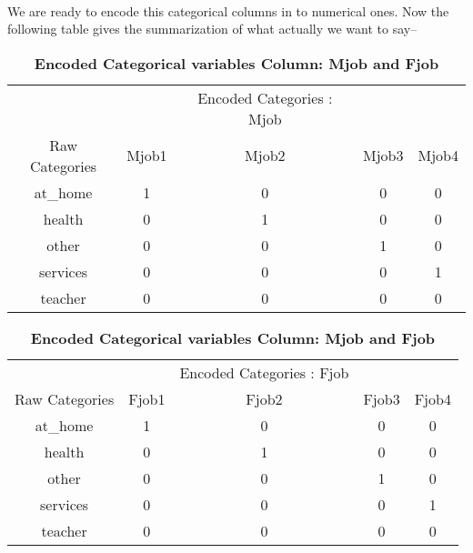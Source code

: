 \documentclass[A4paper,11pt]{report}
\begin{document}
			\paragraph{}We are ready to encode this categorical columns in to numerical ones. Now the following table gives the summarization of what actually we want to say--
			\begin{table}[htb]
				\footnotesize
				\caption{\textbf{Encoded Categorical variables Column: Mjob and Fjob}}\label{tab:table}
				\begin{adjustbox}{width=\textwidth,center = \textwidth}
				\begin{tabular}{|c|c c c c |}
					\hline
					& &  Encoded Categories : Mjob& &\\
					\cline{2-5}
					Raw Categories & Mjob1&	Mjob2&	Mjob3&	Mjob4\\	
					\hline
					at\_home &1 &0 &0 &0 \\
					health &0 &1 &0 &0 \\
					other &0 &0 &1 &0\\
					services &0 &0 &0 &1\\
					teacher &0 &0 &0 &0\\
					\hline
				\end{tabular}
			\begin{tabular}{|c|c c c c |}
				\hline
				& &  Encoded Categories : Fjob& &\\
				\cline{2-5}
				Raw Categories & Fjob1&	Fjob2&	Fjob3&	Fjob4\\	
				\hline
				at\_home &1 &0 &0 &0 \\
				health &0 &1 &0 &0 \\
				other &0 &0 &1 &0\\
				services &0 &0 &0 &1\\
				teacher &0 &0 &0 &0\\
				\hline
			\end{tabular}
	\end{adjustbox}
	\end{table}
\end{document}
